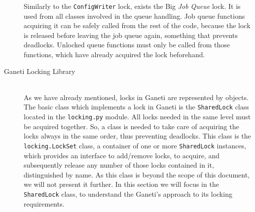 \begin{description}
    Similarly to the \texttt{ConfigWriter} lock, exists the Big \emph{Job Queue}
    lock. It is used from all classes involved in the queue handling. Job queue
    functions acquiring it can be safely called from the rest of the code,
    because the lock is released before leaving the job queue again, something
    that prevents deadlocks. Unlocked queue functions must only be called from
    those functions, which have already acquired the lock beforehand.

  \item[Ganeti Locking Library] \hfill \\
    As we have already mentioned, locks in Ganeti are represented by objects.
    The basic class which implements a lock in Ganeti is the \texttt{SharedLock}
    class located in the \texttt{locking.py} module. All locks needed in the
    same level must be acquired together. So, a class is needed to take care of
    acquiring the locks always in the same order, thus preventing deadlocks.
    This class is the \texttt{locking.LockSet} class, a container of one or more
    \texttt{SharedLock} instances, which provides an interface to add/remove
    locks, to acquire, and subsequently release any number of those locks
    contained in it, distinguished by name. As this class is beyond the scope of
    this document, we will not present it further. In this section we will
    focus in the \texttt{SharedLock} class, to understand the Ganeti's approach
    to its locking requirements.


\end{description}
